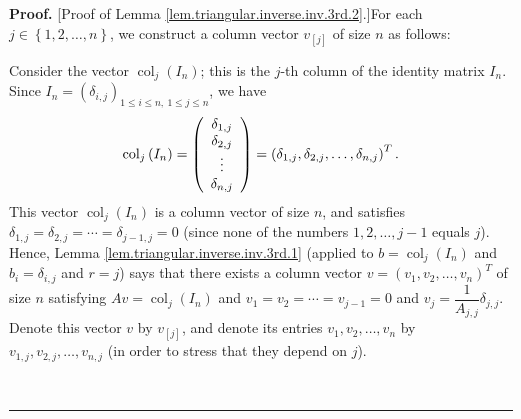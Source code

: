 \documentclass[numbers=enddot,12pt,final,onecolumn,notitlepage]{scrartcl}%
\theoremstyle{definition}
\newenvironment{proof}[1][Proof]{\noindent\textbf{#1.} }{\ \rule{0.5em}{0.5em}}
\begin{document}
\begin{proof}
[Proof of Lemma \ref{lem.triangular.inverse.inv.3rd.2}.]For each $j\in\left\{
1,2,\ldots,n\right\}  $, we construct a column vector $v_{\left[  j\right]  }$
of size $n$ as follows:

Consider the vector $\operatorname*{col}\nolimits_{j}\left(  I_{n}\right)  $;
this is the $j$-th column of the identity matrix $I_{n}$. Since $I_{n}=\left(
\delta_{i,j}\right)  _{1\leq i\leq n,\ 1\leq j\leq n}$, we have%
\[
\operatorname*{col}\nolimits_{j}\left(  I_{n}\right)  =\left(
\begin{array}
[c]{c}%
\delta_{1,j}\\
\delta_{2,j}\\
\vdots\\
\delta_{n,j}%
\end{array}
\right)  =\left(  \delta_{1,j},\delta_{2,j},\ldots,\delta_{n,j}\right)  ^{T}.
\]
This vector $\operatorname*{col}\nolimits_{j}\left(  I_{n}\right)  $ is a
column vector of size $n$, and satisfies $\delta_{1,j}=\delta_{2,j}%
=\cdots=\delta_{j-1,j}=0$ (since none of the numbers $1,2,\ldots,j-1$ equals
$j$). Hence, Lemma \ref{lem.triangular.inverse.inv.3rd.1} (applied to
$b=\operatorname*{col}\nolimits_{j}\left(  I_{n}\right)  $ and $b_{i}%
=\delta_{i,j}$ and $r=j$) says that there exists a column vector $v=\left(
v_{1},v_{2},\ldots,v_{n}\right)  ^{T}$ of size $n$ satisfying
$Av=\operatorname*{col}\nolimits_{j}\left(  I_{n}\right)  $ and $v_{1}%
=v_{2}=\cdots=v_{j-1}=0$ and $v_{j}=\dfrac{1}{A_{j,j}}\delta_{j,j}$. Denote
this vector $v$ by $v_{\left[  j\right]  }$, and denote its entries
$v_{1},v_{2},\ldots,v_{n}$ by $v_{1,j},v_{2,j},\ldots,v_{n,j}$ (in order to
stress that they depend on $j$).


\end{proof}
\end{document}
